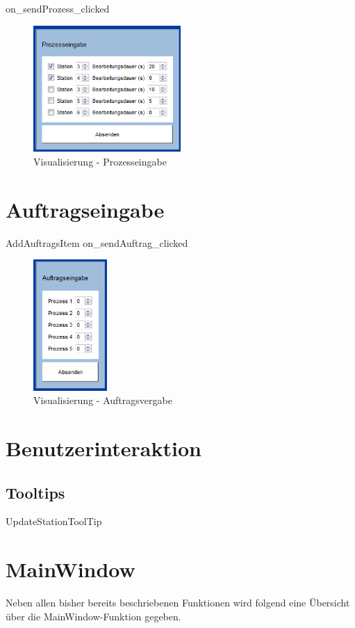 on_sendProzess_clicked

\begin{figure}[htb]
    \centering
    \includegraphics[width=0.5\textwidth]{Abbildungen/Prozesseingabe.png}
    \caption{Visualisierung - Prozesseingabe}		
    \label{fig:Prozesseingabe}
\end{figure}

\section{Auftragseingabe}
\label{sec:Auftragseingabe}

AddAuftragsItem
on_sendAuftrag_clicked

\begin{figure}[htb]
    \centering
    \includegraphics[width=0.25\textwidth]{Abbildungen/Auftragsvergabe.png}
    \caption{Visualisierung - Auftragsvergabe}		
    \label{fig:Auftragsvergabe}
\end{figure}


\section{Benutzerinteraktion}

\subsection{Tooltips}
\label{sec:tooltips}
UpdateStationToolTip

\section{MainWindow}

Neben allen bisher bereits beschriebenen Funktionen wird folgend eine Übersicht über die MainWindow-Funktion gegeben. 

